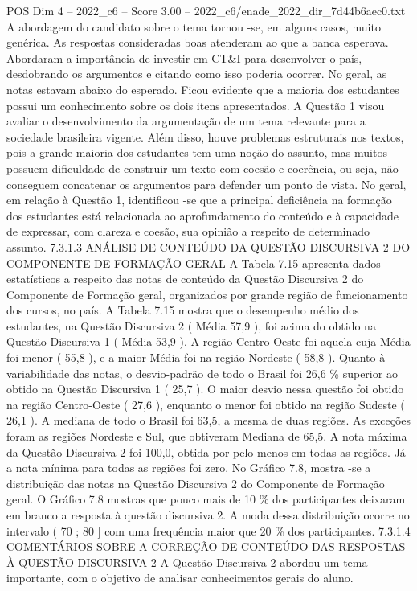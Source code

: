 \begin{textsample}{POS Dim 4 – 2022\_c6 – Score 3.00 – 2022\_c6/enade\_2022\_dir\_7d44b6aec0.txt}
A abordagem do candidato sobre o tema tornou -se, em alguns casos, muito genérica.
As respostas consideradas boas atenderam ao que a banca esperava.
Abordaram a importância de investir em CT\&I para desenvolver o país, desdobrando os argumentos e citando como isso poderia ocorrer.
No geral, as notas estavam abaixo do esperado.
Ficou evidente que a maioria dos estudantes possui um conhecimento sobre os dois itens apresentados.
A Questão 1 visou avaliar o desenvolvimento da argumentação de um tema relevante para a sociedade brasileira vigente.
Além disso, houve problemas estruturais nos textos, pois a grande maioria dos estudantes tem uma noção do assunto, mas muitos possuem dificuldade de construir um texto com coesão e coerência, ou seja, não conseguem concatenar os argumentos para defender um ponto de vista.
No geral, em relação à Questão 1, identificou -se que a principal deficiência na formação dos estudantes está relacionada ao aprofundamento do conteúdo e à capacidade de expressar, com clareza e coesão, sua opinião a respeito de determinado assunto. 7.3.1.3 ANÁLISE DE CONTEÚDO DA QUESTÃO DISCURSIVA 2 DO COMPONENTE DE FORMAÇÃO GERAL A Tabela 7.15 apresenta dados estatísticos a respeito das notas de conteúdo da Questão Discursiva 2 do Componente de Formação geral, organizados por grande região de funcionamento dos cursos, no país.
A Tabela 7.15 mostra que o desempenho médio dos estudantes, na Questão Discursiva 2 ( Média 57,9 ), foi acima do obtido na Questão Discursiva 1 ( Média 53,9 ).
A região Centro-Oeste foi aquela cuja Média foi menor ( 55,8 ), e a maior Média foi na região Nordeste ( 58,8 ).
Quanto à variabilidade das notas, o desvio-padrão de todo o Brasil foi 26,6 \% superior ao obtido na Questão Discursiva 1 ( 25,7 ).
O maior desvio nessa questão foi obtido na região Centro-Oeste ( 27,6 ), enquanto o menor foi obtido na região Sudeste ( 26,1 ).
A mediana de todo o Brasil foi 63,5, a mesma de duas regiões.
As exceções foram as regiões Nordeste e Sul, que obtiveram Mediana de 65,5.
A nota máxima da Questão Discursiva 2 foi 100,0, obtida por pelo menos em todas as regiões.
Já a nota mínima para todas as regiões foi zero.
No Gráfico 7.8, mostra -se a distribuição das notas na Questão Discursiva 2 do Componente de Formação geral.
O Gráfico 7.8 mostras que pouco mais de 10 \% dos participantes deixaram em branco a resposta à questão discursiva 2.
A moda dessa distribuição ocorre no intervalo ( 70 ; 80 ] com uma frequência maior que 20 \% dos participantes. 7.3.1.4 COMENTÁRIOS SOBRE A CORREÇÃO DE CONTEÚDO DAS RESPOSTAS À QUESTÃO DISCURSIVA 2 A Questão Discursiva 2 abordou um tema importante, com o objetivo de analisar conhecimentos gerais do aluno.

\end{textsample}
